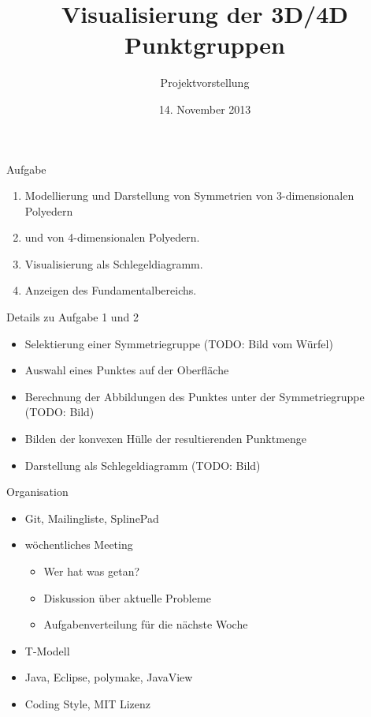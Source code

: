 \documentclass[ucs,11pt]{beamer}
\title[Punktgruppen]{Visualisierung der 3D/4D Punktgruppen}
\subtitle{Projektvorstellung}
\institute[FU Berlin]{Freie Universität Berlin}
\date[14.11.2013]{14. November 2013}
\begin{document}
\begin{frame}[plain]
	\titlepage
\end{frame}

\begin{frame}{Aufgabe}
	\begin{enumerate}
		\item Modellierung und Darstellung von Symmetrien von 3-dimensionalen Polyedern \pause
		\item und von 4-dimensionalen Polyedern. \pause
		\item Visualisierung als Schlegeldiagramm. \pause
		\item Anzeigen des Fundamentalbereichs.
	\end{enumerate}
\end{frame}


\begin{frame}{Details zu Aufgabe 1 und 2}
	\begin{itemize}
		\item Selektierung einer Symmetriegruppe (TODO: Bild vom Würfel)  \pause
		\item Auswahl eines Punktes auf der Oberfläche \pause
		\item Berechnung der Abbildungen des Punktes unter der Symmetriegruppe (TODO: Bild) \pause
		\item Bilden der konvexen Hülle der resultierenden Punktmenge \pause
		\item Darstellung als Schlegeldiagramm (TODO: Bild)
	\end{itemize}
\end{frame}

\begin{frame}{Organisation}
		\begin{itemize}
			\item Git, Mailingliste, SplinePad \pause
			\item wöchentliches Meeting \pause
				\begin{itemize}
					\item Wer hat was getan?
					\item Diskussion über aktuelle Probleme
					\item Aufgabenverteilung für die nächste Woche
				\end{itemize} \pause
			\item T-Modell \pause
			\item Java, Eclipse, polymake, JavaView \pause
			\item Coding Style, MIT Lizenz
		\end{itemize}
\end{frame}
\end{document}
